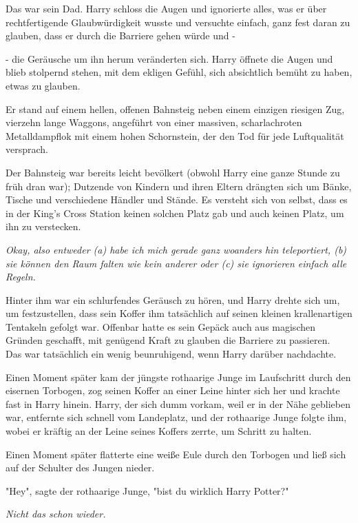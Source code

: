 {Das war sein Dad. Harry schloss die Augen und ignorierte alles, was er über\\ rechtfertigende Glaubwürdigkeit wusste und versuchte einfach, ganz fest daran zu glauben, dass er durch die Barriere gehen würde und -

- die Geräusche um ihn herum veränderten sich. Harry öffnete die Augen und blieb stolpernd stehen, mit dem ekligen Gefühl, sich absichtlich bemüht zu haben, etwas zu glauben.

Er stand auf einem hellen, offenen Bahnsteig neben einem einzigen riesigen Zug, vierzehn lange Waggons, angeführt von einer massiven, scharlachroten Metalldampflok mit einem hohen Schornstein, der den Tod für jede Luftqualität versprach.

Der Bahnsteig war bereits leicht bevölkert (obwohl Harry eine ganze Stunde zu früh dran war); Dutzende von Kindern und ihren Eltern drängten sich um Bänke, Tische und verschiedene Händler und Stände. Es versteht sich von selbst, dass es in der King's Cross Station keinen solchen Platz gab und auch keinen Platz, um ihn zu verstecken.

\emph{Okay, also entweder (a) habe ich mich gerade ganz woanders hin teleportiert, (b) sie können den Raum falten wie kein anderer oder (c) sie ignorieren einfach alle Regeln.}

Hinter ihm war ein schlurfendes Geräusch zu hören, und Harry drehte sich um, um festzustellen, dass sein Koffer ihm tatsächlich auf seinen kleinen krallenartigen Tentakeln gefolgt war. Offenbar hatte es sein Gepäck auch aus magischen Gründen geschafft, mit genügend Kraft zu glauben die Barriere zu passieren.\\ Das war tatsächlich ein wenig beunruhigend, wenn Harry darüber nachdachte.

Einen Moment später kam der jüngste rothaarige Junge im Laufschritt durch den eisernen Torbogen, zog seinen Koffer an einer Leine hinter sich her und krachte fast in Harry hinein. Harry, der sich dumm vorkam, weil er in der Nähe geblieben war, entfernte sich schnell vom Landeplatz, und der rothaarige Junge folgte ihm, wobei er kräftig an der Leine seines Koffers zerrte, um Schritt zu halten.

Einen Moment später flatterte eine weiße Eule durch den Torbogen und ließ sich auf der Schulter des Jungen nieder.

"Hey", sagte der rothaarige Junge, "bist du wirklich Harry Potter?"

\emph{Nicht das schon wieder.}

}

